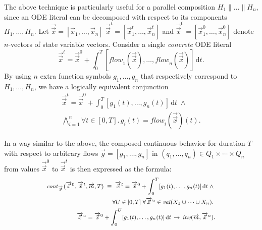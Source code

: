 %
The above technique 
is particularly useful for a parallel composition $H_1 \parallel \ldots \parallel H_n$,
since an ODE literal can be decomposed with respect to its components $H_1, \ldots, H_n$.
Let $\overrightarrow{\vec{x}} = [\vec{x}_{1},\ldots,\vec{x}_{n}]$ 
$\overrightarrow{\vec{x}}^t = [\vec{x}_{1}^t,\ldots,\vec{x}_{n}^t]$
and $\overrightarrow{\vec{x}}^0 = [\vec{x}_{1}^0,\ldots,\vec{x}_{n}^0]$
denote $n$-vectors of state variable vectors.
Consider a single \emph{concrete} ODE literal
\[
\overrightarrow{\vec{x}}^t
=
\overrightarrow{\vec{x}}^0
+
\int_0^T
[\mathit{flow}_1(\overrightarrow{\vec{x}}),\ldots,\mathit{flow}_n(\overrightarrow{\vec{x}})]\,\mathrm{d}t.
\]
By using $n$ extra function symbols $g_1, \ldots, g_n$ that 
respectively correspond to $H_1, \ldots, H_n$,
we have a logically equivalent conjunction 
\begin{align*}
\overrightarrow{\vec{x}}^t
=
\overrightarrow{\vec{x}}^0
+
\int_0^T
[g_1(t),\ldots,g_n(t)]
\,\mathrm{d}t
\;\wedge\;
\\
\bigwedge_{i = 1}^n
\forall t \in [0,T].\,
g_i(t) = \mathit{flow}_i(\overrightarrow{\vec{x}})(t).
\end{align*}



In a way similar to the above,
the composed continuous behavior for duration $T$ 
with respect to arbitrary flows $\overrightarrow{g} = [g_1,\ldots,g_n]$ 
in $(q_1,\ldots,q_n) \in Q_1 \times \cdots \times Q_n$ 
from values $\overrightarrow{\vec{x}}^0$ to $\overrightarrow{\vec{x}}^t$
is then expressed as the formula:
\[
\begin{medsize}
\begin{aligned}
\mathit{cont}_{\overrightarrow{g}}(\overrightarrow{\vec{x}}^0, \overrightarrow{\vec{x}}^t,
\overrightarrow{m}, T)
\;\equiv\;
\overrightarrow{\vec{x}}^t
= 
\overrightarrow{\vec{x}}^0
+ 
\int_{0}^T 
[g_1(t),\ldots,g_n(t)]
\,\mathrm{d}t
\;\wedge\;
\\
\forall U \in [0,T]\;
\forall \overrightarrow{\vec{x}}^u \in \val(X_1 \cup \cdots \cup X_n).\;
\\
\overrightarrow{\vec{x}}^u
 = 
\overrightarrow{\vec{x}}^0
+ 
\int_{0}^U 
[g_1(t),\ldots,g_n(t)]
\,\mathrm{d}t 
\,\to\,
\mathit{inv}(\overrightarrow{m},\overrightarrow{\vec{x}}^u).
\end{aligned}
\end{medsize}
\]




